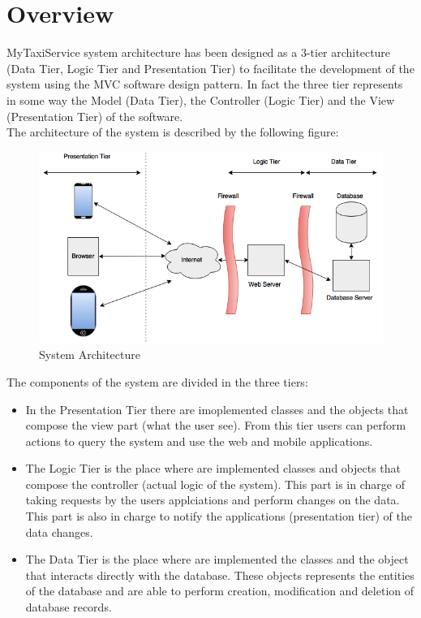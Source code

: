 \documentclass[../../../../dd.tex]{subfiles}
\begin{document}
	\section{Overview}
		MyTaxiService system architecture has been designed as a 3-tier architecture (Data Tier, Logic Tier and Presentation Tier) to facilitate the development of the system using the MVC software design pattern. In fact the three tier represents in some way the Model (Data Tier), the Controller (Logic Tier) and the View (Presentation Tier) of the software.
		\\
		The architecture of the system is described by the following figure:
		\begin{figure}[H]
			\centering
			\includegraphics[width=\textwidth, scale=0.5]{../../rasd/IMG/ServerArchitecture.png}
			\caption{System Architecture}\label{fig:SystemArchitecture}
		\end{figure}
		The components of the system are divided in the three tiers:
		\begin{itemize}
			\item In the Presentation Tier there are imoplemented classes and the objects that compose the view part (what the user see). From this tier users can perform actions to query the system and use the web and mobile applications.
			\item The Logic Tier is the place where are implemented classes and objects that compose the controller (actual logic of the system). This part is in charge of taking requests by the users applciations and perform changes on the data. This part is also in charge to notify the applications (presentation tier) of the data changes.
			\item The Data Tier is the place where are implemented the classes and the object that interacts directly with the database. These objects represents the entities of the database and are able to perform creation, modification and deletion of database records.
		\end{itemize}
\end{document}
